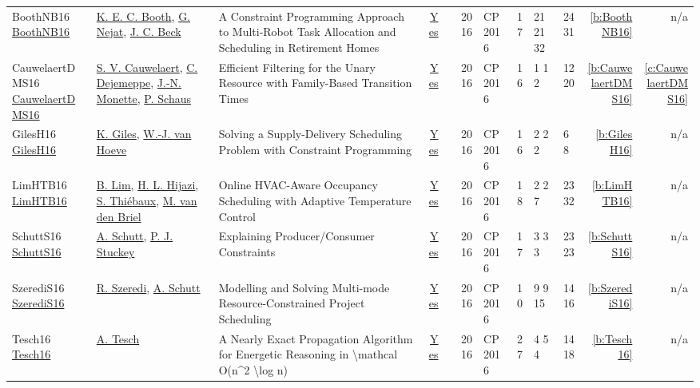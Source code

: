 {\begin{longtable}{>{\raggedright\arraybackslash}p{3cm}>{\raggedright\arraybackslash}p{4.5cm}>{\raggedright\arraybackslash}p{6.0cm}rrrp{2.5cm}rp{1cm}p{1cm}rr}
BoothNB16 \href{https://doi.org/10.1007/978-3-319-44953-1_34}{BoothNB16} & \hyperref[auth:a203]{K. E. C. Booth}, \hyperref[auth:a204]{G. Nejat}, \hyperref[auth:a89]{J. C. Beck} & \cellcolor{green!10}A Constraint Programming Approach to Multi-Robot Task Allocation and Scheduling in Retirement Homes & \href{../works/BoothNB16.pdf}{Yes} & \cite{BoothNB16} & 2016 & CP 2016 & 17 & 21 21 32 & 24 31 & \ref{b:BoothNB16} & n/a\\
CauwelaertDMS16 \href{https://doi.org/10.1007/978-3-319-44953-1_33}{CauwelaertDMS16} & \hyperref[auth:a201]{S. V. Cauwelaert}, \hyperref[auth:a202]{C. Dejemeppe}, \hyperref[auth:a149]{J.-N. Monette}, \hyperref[auth:a147]{P. Schaus} & Efficient Filtering for the Unary Resource with Family-Based Transition Times & \href{../works/CauwelaertDMS16.pdf}{Yes} & \cite{CauwelaertDMS16} & 2016 & CP 2016 & 16 & 1 1 2 & 12 20 & \ref{b:CauwelaertDMS16} & \ref{c:CauwelaertDMS16}\\
GilesH16 \href{https://doi.org/10.1007/978-3-319-44953-1_38}{GilesH16} & \hyperref[auth:a205]{K. Giles}, \hyperref[auth:a206]{W.-J. van Hoeve} & Solving a Supply-Delivery Scheduling Problem with Constraint Programming & \href{../works/GilesH16.pdf}{Yes} & \cite{GilesH16} & 2016 & CP 2016 & 16 & 2 2 2 & 6 8 & \ref{b:GilesH16} & n/a\\
LimHTB16 \href{https://doi.org/10.1007/978-3-319-44953-1_43}{LimHTB16} & \hyperref[auth:a207]{B. Lim}, \hyperref[auth:a208]{H. L. Hijazi}, \hyperref[auth:a209]{S. Thi{\'{e}}baux}, \hyperref[auth:a210]{M. van den Briel} & Online HVAC-Aware Occupancy Scheduling with Adaptive Temperature Control & \href{../works/LimHTB16.pdf}{Yes} & \cite{LimHTB16} & 2016 & CP 2016 & 18 & 2 2 7 & 23 32 & \ref{b:LimHTB16} & n/a\\
SchuttS16 \href{https://doi.org/10.1007/978-3-319-44953-1_28}{SchuttS16} & \hyperref[auth:a124]{A. Schutt}, \hyperref[auth:a125]{P. J. Stuckey} & Explaining Producer/Consumer Constraints & \href{../works/SchuttS16.pdf}{Yes} & \cite{SchuttS16} & 2016 & CP 2016 & 17 & 3 3 3 & 23 23 & \ref{b:SchuttS16} & n/a\\
SzerediS16 \href{https://doi.org/10.1007/978-3-319-44953-1_31}{SzerediS16} & \hyperref[auth:a200]{R. Szeredi}, \hyperref[auth:a124]{A. Schutt} & Modelling and Solving Multi-mode Resource-Constrained Project Scheduling & \href{../works/SzerediS16.pdf}{Yes} & \cite{SzerediS16} & 2016 & CP 2016 & 10 & 9 9 15 & 14 16 & \ref{b:SzerediS16} & n/a\\
Tesch16 \href{https://doi.org/10.1007/978-3-319-44953-1_32}{Tesch16} & \hyperref[auth:a183]{A. Tesch} & A Nearly Exact Propagation Algorithm for Energetic Reasoning in {\textbackslash}mathcal O(n{\^{}}2 {\textbackslash}log n) & \href{../works/Tesch16.pdf}{Yes} & \cite{Tesch16} & 2016 & CP 2016 & 27 & 4 5 4 & 14 18 & \ref{b:Tesch16} & n/a\\

\end{longtable}}
